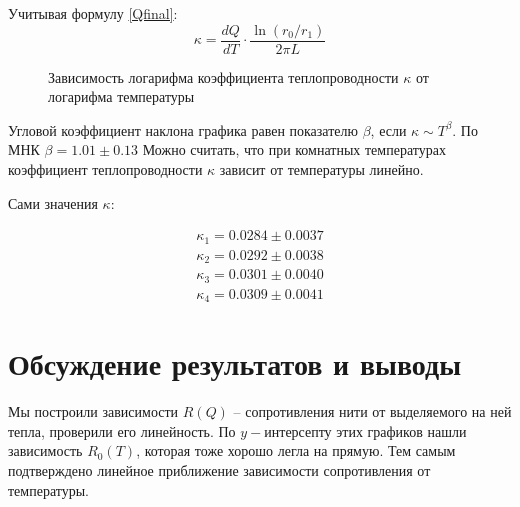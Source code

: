 \documentclass[a4paper,12pt]{report}
\begin{document}
    Учитывая формулу \eqref{Qfinal}:
    \begin{equation*}
        \kappa=\frac{dQ}{dT}\cdot\frac{\ln(r_0/r_1)}{2\pi L}
    \end{equation*}

    \begin{figure}[H]
        \centering
        \caption{Зависимость логарифма коэффициента теплопроводности $\kappa$ от логарифма температуры}
    \end{figure}

    Угловой коэффициент наклона графика равен показателю $\beta$, если $\kappa\sim T^\beta$. По МНК $\beta=1.01\pm 0.13 $ Можно считать, что при комнатных температурах коэффициент теплопроводности $\kappa$ зависит от температуры линейно.

    Сами значения $\kappa$:

    \begin{align*}
        \kappa_1=0.0284\pm 0.0037 \\
        \kappa_2=0.0292\pm 0.0038 \\
        \kappa_3=0.0301\pm 0.0040 \\ 
        \kappa_4=0.0309\pm 0.0041 
    \end{align*}
    
    \section*{Обсуждение результатов и выводы}
    Мы построили зависимости $R(Q)$ -- сопротивления нити от выделяемого на ней тепла, проверили его линейность. По $y-$интерсепту этих графиков нашли зависимость $R_0(T)$, которая тоже хорошо легла на прямую. Тем самым подтверждено линейное приближение зависимости сопротивления от температуры.
    
\end{document}

